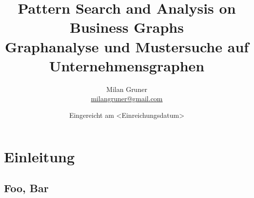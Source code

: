 \documentclass[
        a4paper,     %
        titlepage,   %
        twoside,     %
        parskip      %
        ]{scrartcl} %
\title{Pattern Search and Analysis on Business Graphs
\\ \bigskip 
\large{Graphanalyse und Mustersuche auf Unternehmensgraphen}}
\author{Milan Gruner\\{\small{\url{milangruner@gmail.com}}}}
\date{Eingereicht am <Einreichungsdatum>}
\begin{document}
  \maketitle    %


  \cleardoublepage %



  \section{Einleitung}

    \cite{vossen94datenmodelle}

    \cite{ullman83principles}

    \subsection{Foo, Bar}

    \cite{agrawal94fast}

    \cite{bloom70space-time}



    \clearpage %
    
\end{document}
